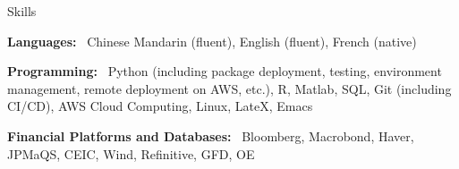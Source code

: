\documentclass[usegeometry, 10pt, a4paper]{cv} %
\newcommand{\activite}[1]{\textbf{#1}\ }
\begin{document}
\vspace{0.5cm}

\begin{rubriquetableau}[0.95\textwidth]{Skills}\\
  \vspace{-0.5cm}

\activite{Languages:} Chinese Mandarin (fluent), English (fluent), French (native)\\

  \vspace{0.4cm}

\activite{Programming:} Python (including package deployment, testing, environment management, remote deployment on AWS, etc.), \textsf{R}, Matlab, SQL, Git (including CI/CD), AWS Cloud Computing, Linux, LateX, Emacs \\

  \vspace{0.4cm}

\activite{Financial Platforms and Databases:} Bloomberg, Macrobond, Haver, JPMaQS, CEIC, Wind, Refinitive, GFD, OE

\end{rubriquetableau}


\newpage

\end{document}
